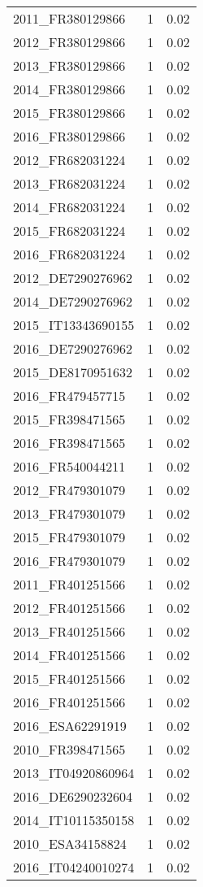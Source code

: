 \begin{table*}[htbp]
\begin{tabular}{lrr}
2011_FR380129866 & 1 & 0.02 \\
2012_FR380129866 & 1 & 0.02 \\
2013_FR380129866 & 1 & 0.02 \\
2014_FR380129866 & 1 & 0.02 \\
2015_FR380129866 & 1 & 0.02 \\
2016_FR380129866 & 1 & 0.02 \\
2012_FR682031224 & 1 & 0.02 \\
2013_FR682031224 & 1 & 0.02 \\
2014_FR682031224 & 1 & 0.02 \\
2015_FR682031224 & 1 & 0.02 \\
2016_FR682031224 & 1 & 0.02 \\
2012_DE7290276962 & 1 & 0.02 \\
2014_DE7290276962 & 1 & 0.02 \\
2015_IT13343690155 & 1 & 0.02 \\
2016_DE7290276962 & 1 & 0.02 \\
2015_DE8170951632 & 1 & 0.02 \\
2016_FR479457715 & 1 & 0.02 \\
2015_FR398471565 & 1 & 0.02 \\
2016_FR398471565 & 1 & 0.02 \\
2016_FR540044211 & 1 & 0.02 \\
2012_FR479301079 & 1 & 0.02 \\
2013_FR479301079 & 1 & 0.02 \\
2015_FR479301079 & 1 & 0.02 \\
2016_FR479301079 & 1 & 0.02 \\
2011_FR401251566 & 1 & 0.02 \\
2012_FR401251566 & 1 & 0.02 \\
2013_FR401251566 & 1 & 0.02 \\
2014_FR401251566 & 1 & 0.02 \\
2015_FR401251566 & 1 & 0.02 \\
2016_FR401251566 & 1 & 0.02 \\
2016_ESA62291919 & 1 & 0.02 \\
2010_FR398471565 & 1 & 0.02 \\
2013_IT04920860964 & 1 & 0.02 \\
2016_DE6290232604 & 1 & 0.02 \\
2014_IT10115350158 & 1 & 0.02 \\
2010_ESA34158824 & 1 & 0.02 \\
2016_IT04240010274 & 1 & 0.02 \\

\end{tabular}
\end{table*}
